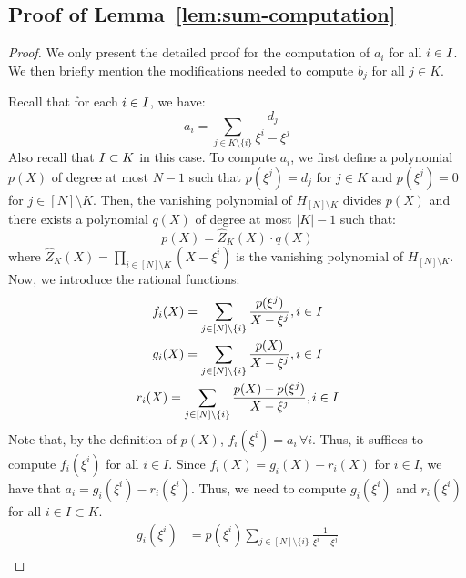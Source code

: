 \subsection{Proof of Lemma~\ref{lem:sum-computation}}\label{subsec:sum-computation}

\begin{proof}

    We only present the detailed proof for the computation of $a_i$ for all $i \in I$. We then briefly mention the modifications needed to compute $b_j$ for all $j \in K$.
    
    \smallskip
    
     Recall that for each $i \in I$, we have:
    \begin{equation}\label{eq:ei}
    a_i = \sum_{j\in K\setminus \{i\}} \frac{d_j}{\xi^i - \xi^j}
    \end{equation}
    Also recall that $I \subset K$ in this case.
    To compute $a_i$, we first define a polynomial $p(X)$ of degree at most $N-1$ such that
    $p(\xi^j)=d_j$ for $j\in K$ and $p(\xi^j)=0$ for $j \in [N]\setminus K$.
    Then, the vanishing polynomial of $H_{[N]\setminus K}$ divides $p(X)$ and
    there exists a polynomial $q(X)$ of degree at most $|K|-1$ such that:
    \begin{equation}\label{eq:px}
    p(X) = \hat{Z}_K(X)\cdot q(X)
    \end{equation}
    where $\hat{Z}_K(X)=\prod_{i\in [N]\setminus K}(X-\xi^i)$ is the vanishing polynomial of $H_{[N]\setminus K}$. Now, we introduce the rational functions:
    \begin{gather}\label{eq:fgr}
    f_i(X) = \sum_{j\in [N]\setminus \{i\}}\frac{p(\xi^j)}{X-\xi^j}, i\in \setind \\
    g_i(X) = \sum_{j\in [N]\setminus \{i\}}\frac{p(X)}{X-\xi^j}, i\in \setind \\
    r_i(X) = \sum_{j\in [N]\setminus \{i\}}\frac{p(X) - p(\xi^j)}{X-\xi^j}, i\in \setind
    \end{gather}
    Note that, by the definition of $p(X)$, $f_i(\xi^i)=a_i \,\forall i$. Thus, it suffices to compute $f_i(\xi^i)$ for all $i \in I$. Since $f_i(X) = g_i(X) - r_i(X)$ for $i\in I$, we have that
    $a_i=g_i(\xi^i)-r_i(\xi^i)$.
    Thus, we need to compute $g_i(\xi^i)$ and $r_i(\xi^i)$ for all $i \in I \subset K$.
    \begin{align*}
        g_i(\xi^i) &= p(\xi^i)\sum_{j\in [N]\setminus \{i\}} \frac{1}{\xi^i-\xi^j} \\

\end{align*}
\end{proof}
